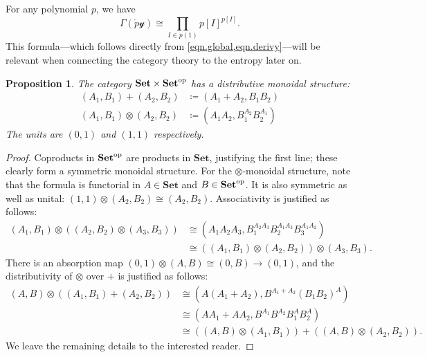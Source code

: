 \documentclass[11pt, one side, article]{memoir}
\theoremstyle{definition}
\theoremstyle{plain}
\newtheorem{proposition}[definitionx]{Proposition}
\newenvironment{example}
  {\pushQED{\qed}\renewcommand{\qedsymbol}{$\lozenge$}\examplex}
  {\popQED\endexamplex}
\newcommand{\Cat}[1]{\mathbf{#1}}%
\newcommand{\op}{^\tn{op}}
\newcommand{\tn}[1]{\textnormal{#1}}
\newcommand{\smset}{\Cat{Set}}
\newcommand{\yon}{\mathcal{y}}
\newcommand{\0}{\textsf{0}}
\newcommand{\1}{\tn{\textsf{1}}}
\begin{document}
\begin{example}\label{ex.global_E}
For any polynomial $p$, we have
\[
\Gamma(\dot{p}\yon)\cong\prod_{I\in p(1)}p[I]^{p[I]}.
\]
This formula---which follows directly from \cref{eqn.global,eqn.derivy}---will be relevant when connecting the category theory to the entropy later on. 
\end{example}

\begin{proposition}
The category $\smset\times\smset\op$ has a distributive monoidal structure:
\begin{align*}
  (A_1,B_1)+(A_2,B_2)&\coloneqq(A_1+A_2,B_1B_2)\\
  (A_1,B_1)\otimes(A_2,B_2)&\coloneqq(A_1A_2,B_1^{A_2}B_2^{A_1})
\end{align*}
The units are $(0,1)$ and $(1,1)$ respectively.
\end{proposition}
\begin{proof}
Coproducts in $\smset\op$ are products in $\smset$, justifying the first line; these clearly form a symmetric monoidal structure. For the $\otimes$-monoidal structure, note that the formula is functorial in $A\in\smset$ and $B\in\smset\op$. It is also symmetric as well as unital: $(1,1)\otimes(A_2,B_2)\cong(A_2,B_2)$. Associativity is justified as follows:
\begin{align*}
  (A_1,B_1)\otimes((A_2,B_2)\otimes(A_3,B_3))&\cong
	(A_1A_2A_3,B_1^{A_2A_3}B_2^{A_1A_3}B_3^{A_1A_2})\\&\cong
	((A_1,B_1)\otimes(A_2,B_2))\otimes(A_3,B_3).
\end{align*}
There is an absorption map $(0,1)\otimes (A,B)\cong(0,B)\to(0,1)$, and the distributivity of $\otimes$ over $+$ is justified as follows:
\begin{align*}
  (A,B)\otimes((A_1,B_1)+(A_2,B_2))&\cong 
  (A(A_1+A_2),B^{A_1+A_2}(B_1B_2)^A)\\&\cong
  (AA_1+AA_2,B^{A_1}B^{A_2}B_1^AB_2^A)\\&\cong
  ((A,B)\otimes(A_1,B_1))+((A,B)\otimes(A_2,B_2)).
\end{align*}
We leave the remaining details to the interested reader.
\end{proof}
\end{document}
